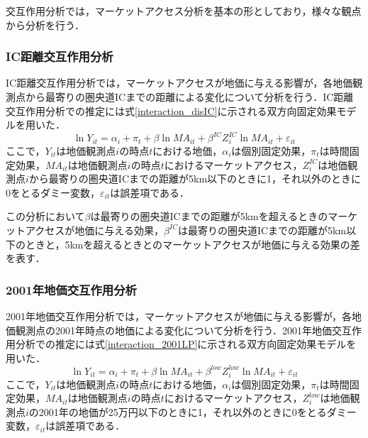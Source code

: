 交互作用分析では，マーケットアクセス分析を基本の形としており，様々な観点から分析を行う．
\subsubsection{IC距離交互作用分析}
IC距離交互作用分析では，マーケットアクセスが地価に与える影響が，各地価観測点から最寄りの圏央道ICまでの距離による変化について分析を行う．IC距離交互作用分析での推定には式\ref{interaction_disIC}に示される双方向固定効果モデルを用いた．
\begin{equation}
  \ln{Y_{it}} = \alpha_{i} + \pi_{t} + \beta\ln{MA_{it}} + \beta^{IC}Z^{IC}_{i}\ln{MA_{it}} + \varepsilon_{it}
  \label{interaction_disIC}
\end{equation}
ここで，$Y_{it}$は地価観測点$i$の時点$t$における地価，$\alpha_{i}$は個別固定効果，$\pi_{t}$は時間固定効果，$MA_{it}$は地価観測点$i$の時点$t$におけるマーケットアクセス，$Z^{IC}_{i}$は地価観測点$i$から最寄りの圏央道ICまでの距離が5km以下のときに1，それ以外のときに0をとるダミー変数，$\varepsilon_{it}$は誤差項である．

この分析において$\beta$は最寄りの圏央道ICまでの距離が5kmを超えるときのマーケットアクセスが地価に与える効果，$\beta^{IC}$は最寄りの圏央道ICまでの距離が5km以下のときと，5kmを超えるときとのマーケットアクセスが地価に与える効果の差を表す．
\subsubsection{2001年地価交互作用分析}
2001年地価交互作用分析では，マーケットアクセスが地価に与える影響が，各地価観測点の2001年時点の地価による変化について分析を行う．2001年地価交互作用分析での推定には式\ref{interaction_2001LP}に示される双方向固定効果モデルを用いた．
\begin{equation}
  \ln{Y_{it}} = \alpha_{i} + \pi_{t} + \beta\ln{MA_{it}} + \beta^{low}Z^{low}_{i}\ln{MA_{it}} + \varepsilon_{it}
  \label{interaction_2001LP}
\end{equation}
ここで，$Y_{it}$は地価観測点$i$の時点$t$における地価，$\alpha_{i}$は個別固定効果，$\pi_{t}$は時間固定効果，$MA_{it}$は地価観測点$i$の時点$t$におけるマーケットアクセス，$Z^{low}_{i}$は地価観測点$i$の2001年の地価が25万円以下のときに1，それ以外のときに0をとるダミー変数，$\varepsilon_{it}$は誤差項である．

